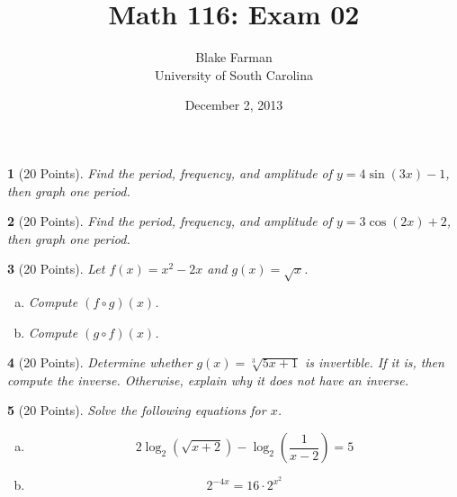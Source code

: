 \documentclass[12pt]{amsart}
\author{Blake Farman\\University of South Carolina}
\title{Math 116: Exam 02}
\date{December 2, 2013}
\begin{document}
\maketitle

\begin{center}
\end{center}

\vspace{0.2in}
\vspace{0.2in}

\theoremstyle{plain}
\newtheorem{thm}{}
\newtheorem{lem}{Lemma}
\theoremstyle{definition}
\newtheorem{defn}{Definition}

\begin{thm}[20 Points]\label{ex1}
  Find the period, frequency, and amplitude of $y = 4\sin(3x) - 1$, then graph one period.
\end{thm}

\newpage

\begin{thm}[20 Points]\label{ex2}
  Find the period, frequency, and amplitude of $y = 3\cos(2x) + 2$, then graph one period.
\end{thm}

\newpage
\begin{thm}[20 Points]\label{ex3}
  Let $f(x) = x^2 - 2x$ and $g(x) = \sqrt{x}$.
  \begin{enumerate}[(a)]
  \item
    Compute $(f \circ g)(x)$.
    \vspace{2in}
  \item
    Compute $(g \circ f)(x)$.
    \vspace{2in}
  \end{enumerate}
\end{thm}

\begin{thm}[20 Points]\label{ex4}
  Determine whether $g(x) = \sqrt[3]{5x + 1}$ is invertible.
  If it is, then compute the inverse.  
  Otherwise, explain why it does not have an inverse.
\end{thm}

\newpage

\begin{thm}[20 Points]\label{ex5}
  Solve the following equations for $x$.
  \begin{enumerate}[(a)]
  \item
    $$ 2\log_2(\sqrt{x + 2}) - \log_2\left(\frac{1}{x - 2}\right) = 5 $$
    \vspace{3.5in}
  \item
    $$2^{-4x} = 16 \cdot 2^{x^2}$$
  \end{enumerate}
\end{thm}
\end{document}
